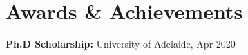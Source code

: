 \documentclass[letterpaper,11pt]{article}
\newcommand{\resumeSubHeadingListStart}{\begin{itemize}[leftmargin=0.15in, label={}]}
\newcommand{\resumeSubHeadingListEnd}{\end{itemize}}
\begin{document}




\section{Awards \& Achievements}
  \vspace{2pt}
  \resumeSubHeadingListStart
    \small{\item{
        \textbf{Ph.D Scholarship: }{University of Adelaide, Apr 2020} \\ \vspace{3pt}

    
        
        
        
        
        
    }}
  \resumeSubHeadingListEnd
\end{document}

